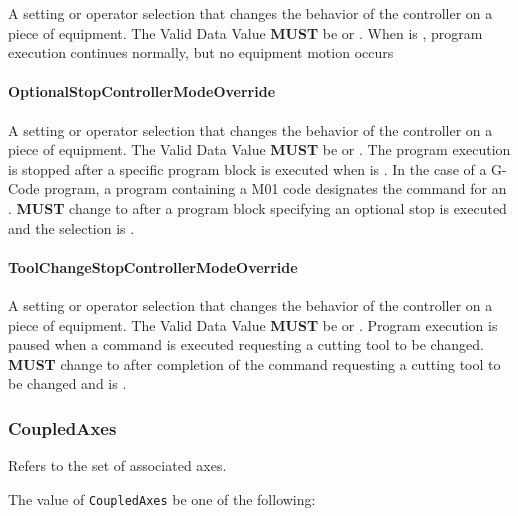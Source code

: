 A setting or operator selection that changes the behavior of the controller on a piece of equipment. 
 The \gls{Valid Data Value} \textbf{MUST} be  or . 
 When  is , program execution continues normally, but no equipment motion occurs 


\paragraph{OptionalStopControllerModeOverride}\mbox{}
\label{sec:OptionalStopControllerModeOverride}


A setting or operator selection that changes the behavior of the controller on a piece of equipment. 
 The \gls{Valid Data Value} \textbf{MUST} be  or .
 The program execution is stopped after a specific program block is executed when  is .    
 In the case of a G-Code program, a program  containing a M01 code designates the command for an . 
  \textbf{MUST} change to  after a program block specifying an optional stop is executed and the  selection is .


\paragraph{ToolChangeStopControllerModeOverride}\mbox{}
\label{sec:ToolChangeStopControllerModeOverride}


A setting or operator selection that changes the behavior of the controller on a piece of equipment. 
 The \gls{Valid Data Value} \textbf{MUST} be  or . 
 Program execution is paused when a command is executed requesting a cutting tool to be changed. 
  \textbf{MUST} change to  after completion of the command requesting a cutting tool to be changed and  is .


\subsubsection{CoupledAxes}
\label{sec:CoupledAxes}



Refers to the set of associated axes.


The value of \texttt{CoupledAxes} \MUST be one of the following: 

